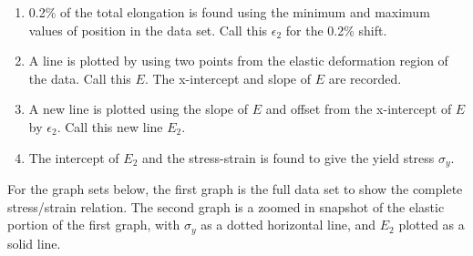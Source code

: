 \documentclass{article}
\begin{document}
\begin{enumerate}
	\item 0.2\% of the total elongation is found using the minimum and maximum  values of position in the data set. Call this $\epsilon_2$ for the 0.2\% shift.
	\item A line is plotted by using two points from the elastic deformation region of the data. Call this $E$. The x-intercept and slope of $E$ are recorded.
	\item A new line is plotted using the slope of $E$ and offset from the x-intercept of $E$ by $\epsilon_2$. Call this new line $E_2$.
	\item The intercept of $E_2$ and the stress-strain is found to give the yield stress $\sigma_y$.
\end{enumerate}

For the graph sets below, the first graph is the full data set to show the complete stress/strain relation. The second graph is a zoomed in snapshot of the elastic portion of the first graph, with $\sigma_y$ as a dotted horizontal line, and $E_2$ plotted as a solid line.
\end{document}
